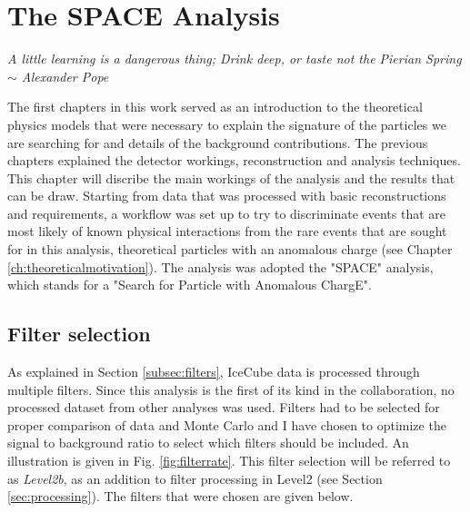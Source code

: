 \chapter{The SPACE Analysis}
\label{ch:space}
\begin{flushright}
\textit{A little learning is a dangerous thing; Drink deep, or taste not the Pierian Spring \\$\sim$ Alexander Pope}
\end{flushright}

\noindent The first chapters in this work served as an introduction to the theoretical physics models that were necessary to explain the signature of the particles we are searching for and details of the background contributions. The previous chapters explained the detector workings, reconstruction and analysis techniques. This chapter will discribe the main workings of the analysis and the results that can be draw. Starting from data that was processed with basic reconstructions and requirements, a workflow was set up to try to discriminate events that are most likely of known physical interactions from the rare events that are sought for in this analysis, theoretical particles with an anomalous charge (see Chapter \ref{ch:theoreticalmotivation}). The analysis was adopted the "SPACE" analysis, which stands for a "Search for Particle with Anomalous ChargE".

\section{Filter selection}
As explained in Section \ref{subsec:filters}, IceCube data is processed through multiple filters. Since this analysis is the first of its kind in the collaboration, no processed dataset from other analyses was used. Filters had to be selected for proper comparison of data and Monte Carlo and I have chosen to optimize the signal to background ratio to select which filters should be included. An illustration is given in Fig. \ref{fig:filterrate}. This filter selection will be referred to as \textit{Level2b}, as an addition to filter processing in Level2 (see Section \ref{sec:processing}). The filters that were chosen are given below. 

